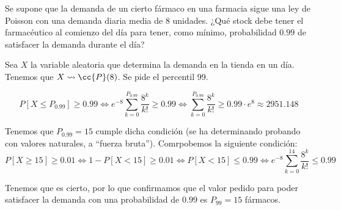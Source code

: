\begin{ejercicio}
     Se supone que la demanda de un cierto fármaco en una farmacia sigue una ley de Poisson con una demanda diaria media de 8 unidades. ¿Qué stock debe tener el farmacéutico al comienzo del día para tener, como mínimo, probabilidad $0.99$ de satisfacer la demanda durante el día?

     Sea $X$ la variable aleatoria que determina la demanda en la tienda en un día. Tenemos que $X\leadsto \cc{P}(8)$. Se pide el percentil 99.
     
     \begin{equation*}
         P[X\leq P_{0.99}]\geq 0.99
         \Longleftrightarrow e^{-8}\sum_{k=0}^{P_{0.99}} \frac{8^k}{k!}\geq 0.99
         \Longleftrightarrow \sum_{k=0}^{P_{0.99}} \frac{8^k}{k!}\geq 0.99\cdot e^8 \approx 2951.148
     \end{equation*}

     Tenemos que $P_{0.99}=15$ cumple dicha condición (se ha determinando probando con valores naturales, a ``fuerza bruta''). Comrpobemos la siguiente condición:
     \begin{equation*}
         P[X\geq 15]\geq 0.01
         \Longleftrightarrow 
         1-P[X< 15]\geq 0.01
         \Longleftrightarrow 
        P[X< 15]\leq 0.99
        \Longleftrightarrow 
        e^{-8}\sum_{k=0}^{14}\frac{8^k}{k!}\leq 0.99
     \end{equation*}

     Tenemos que es cierto, por lo que confirmamos que el valor pedido para poder satisfacer la demanda con una probabilidad de $0.99$ es $P_{99}=15$ fármacos.
\end{ejercicio}


